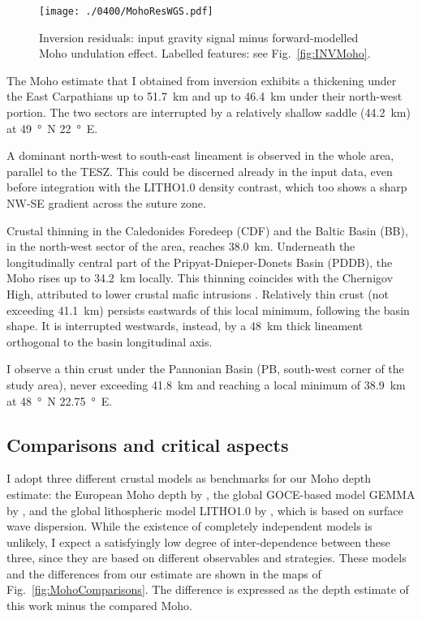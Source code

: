 \begin{figure}
	\begin{adjustbox}{center}
	\texttt{[image: ./0400/MohoResWGS.pdf]}
	\end{adjustbox}
	\caption[Inversion residuals: input gravity signal minus forward-modelled Moho undulation effect.]{Inversion residuals: input gravity signal minus forward-modelled Moho undulation effect. Labelled features: see Fig.~\ref{fig:INVMoho}.}
	\label{fig:INVResMoho}
\end{figure}

The Moho estimate that I obtained from inversion exhibits a thickening under the East Carpathians up to 51.7~\si{\kilo \metre} and up to \SI{46.4}{\kilo \metre} under their north-west portion.
The two sectors are interrupted by a relatively shallow saddle (\SI{44.2}{\kilo \metre}) at \SI{49}{\degree N} \SI{22}{\degree E}.

A dominant north-west to south-east lineament is observed in the whole area, parallel to the TESZ.
This could be discerned already in the input data, even before integration with the {LITHO1.0} density contrast, which too shows a sharp NW-SE gradient across the suture zone.

Crustal thinning  in the Caledonides Foredeep (CDF) and the Baltic Basin (BB), in the north-west sector of the area, reaches \SI{38.0}{\kilo \metre}.
Underneath the longitudinally central part of the Pripyat-Dnieper-Donets Basin (PDDB), the Moho rises up to 34.2~\si{\kilo \metre} locally. This thinning coincides with the Chernigov High, attributed to lower crustal mafic intrusions \parencite{Starostenko2018}.
Relatively thin crust (not exceeding \SI{41.1}{\kilo \metre}) persists eastwards of this local minimum, following the basin shape.
It is interrupted westwards, instead, by a \SI{48}{\kilo \metre} thick lineament orthogonal to the basin longitudinal axis.

I observe a thin crust under the Pannonian Basin (PB, south-west corner of the study area), never exceeding \SI{41.8}{\kilo \metre} and reaching a local minimum of \SI{38.9}{\kilo \metre} at \SI{48}{\degree N} \SI{22.75}{\degree E}.

\subsection{Comparisons and critical aspects}
\label{ss:Appl:DiscGravComp}

I adopt three different crustal models as benchmarks for our Moho depth estimate: the European Moho depth by \textcite{Grad2009}, the global GOCE-based model GEMMA by \textcite{Reguzzoni2015}, and the global lithospheric model {LITHO1.0} by \textcite{Pasyanos2014}, which is based on surface wave dispersion.
While the existence of completely independent models is unlikely, I expect a satisfyingly low degree of inter-dependence between these three, since they are based on different observables and strategies.
These models and the differences from our estimate are shown in the maps of Fig.~\ref{fig:MohoComparisons}.
The difference is expressed as the depth estimate of this work minus the compared Moho.

